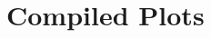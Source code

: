 \documentclass{article}
\begin{document}
\vspace{2cm}  %


% 
% 
% 

\section{Compiled Plots}


\end{document}
